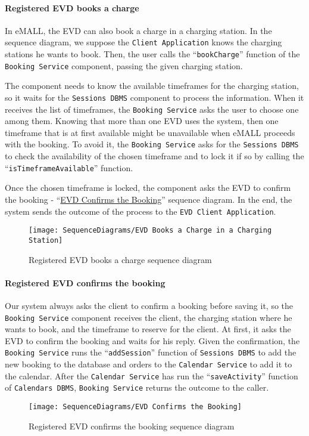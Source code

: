 \paragraph{Registered EVD books a charge}
In eMALL, the EVD can also book a charge in a charging station.
In the sequence diagram, we suppose the \verb|Client Application| knows the charging stations he wants to book.
Then, the user calls the ``\verb|bookCharge|'' function of the \verb|Booking Service| component, passing the given charging station.

The component needs to know the available timeframes for the charging station, so it waits for the \verb|Sessions DBMS| component to process the information.
When it receives the list of timeframes, the \verb|Booking Service| asks the user to choose one among them.
Knowing that more than one EVD uses the system, then one timeframe that is at first available might be unavailable when eMALL proceeds with the booking.
To avoid it, the \verb|Booking Service| asks for the \verb|Sessions DBMS| to check the availability of the chosen timeframe and to lock it if so by calling the ``\verb|isTimeframeAvailable|'' function.

Once the chosen timeframe is locked, the component asks the EVD to confirm the booking - ``\hyperlink{evdconfirmsbooking}{EVD Confirms the Booking}'' sequence diagram.
In the end, the system sends the outcome of the process to the \verb|EVD Client Application|.
\begin{figure}[H]
    \begin{center}
        \texttt{[image: SequenceDiagrams/EVD Books a Charge in a Charging Station]}
        \caption{Registered EVD books a charge sequence diagram}
        \label{fig:evd_books_charge_charging_station}
    \end{center}
\end{figure}

\paragraph{\texorpdfstring{\protect\hypertarget{evdconfirmsbooking}{Registered EVD confirms the booking}}{}}
Our system always asks the client to confirm a booking before saving it, so the \verb|Booking Service| component receives the client, the charging station where he wants to book, and the timeframe to reserve for the client.
At first, it asks the EVD to confirm the booking and waits for his reply.
Given the confirmation, the \verb|Booking Service| runs the ``\verb|addSession|'' function of \verb|Sessions DBMS| to add the new booking to the database and orders to the \verb|Calendar Service| to add it to the calendar.
After the \verb|Calendar Service| has run the ``\verb|saveActivity|'' function of \verb|Calendars DBMS|, \verb|Booking Service| returns the outcome to the caller.
\begin{figure}[H]
    \begin{center}
        \texttt{[image: SequenceDiagrams/EVD Confirms the Booking]}
        \caption{Registered EVD confirms the booking sequence diagram}
        \label{fig:evd_confirms_booking}
    \end{center}
\end{figure}

